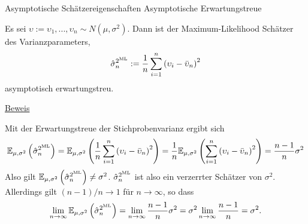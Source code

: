 \documentclass[
  8pt,
  ignorenonframetext,
]{beamer}
\newcommand{\ups} {\upsilon}
\begin{document}
\begin{frame}{\small Asymptotische Schätzereigenschaften \textbar{}
Asymptotische Erwartungstreue}
\protect\hypertarget{asymptotische-schuxe4tzereigenschaften-asymptotische-erwartungstreue-1}{}
\footnotesize
\begin{theorem} 
\justifying
\normalfont
Es sei $\ups := \ups_1,...,\ups_n \sim N(\mu,\sigma^2)$. Dann ist der Maximum-Likelihood
Schätzer des Varianzparameters,
\begin{equation}
\hat{\sigma}_n^{2^{\mbox{\tiny ML}}}
:= \frac{1}{n}\sum_{i=1}^n \left(\ups_i - \bar{\ups}_n \right)^2
\end{equation}
asymptotisch erwartungstreu.
\end{theorem}

\underline{Beweis}

Mit der Erwartungstreue der Stichprobenvarianz ergibt sich\\
\tiny \begin{align*}
\begin{split}
\mathbb{E}_{\mu,\sigma^2}\left(\hat{\sigma}_n^{2^{\mbox{\tiny ML}}} \right)
= \mathbb{E}_{\mu,\sigma^2}\left(\frac{1}{n}\sum_{i=1}^n \left(\ups_i - \bar{\ups}_n \right)^2 \right)
= \frac{1}{n}\mathbb{E}_{\mu,\sigma^2}\left(\sum_{i=1}^n \left(\ups_i - \bar{\ups}_n \right)^2 \right)
=    \frac{n-1}{n}\sigma^2 \\
\end{split}
\end{align*} \footnotesize Also gilt
\(\mathbb{E}_{\mu,\sigma^2}\left(\hat{\sigma}_n^{2^{\mbox{\tiny ML}}} \right) \neq \sigma^2\).
\(\hat{\sigma}_n^{2^{\mbox{\tiny ML}}}\) ist also ein verzerrter
Schätzer von \(\sigma^2\). Allerdings gilt \((n-1)/n \to 1\) für
\(n \to \infty\), so dass \begin{equation}
\lim_{n \to \infty} \mathbb{E}_{\mu,\sigma^2}\left(\hat{\sigma}_n^{2^{\mbox{\tiny ML}}}\right) =
\lim_{n \to \infty}  \frac{n-1}{n}\sigma^2 =
\sigma^2 \lim_{n \to \infty}  \frac{n-1}{n} =
\sigma^2.
\end{equation}
\end{frame}
\end{document}
